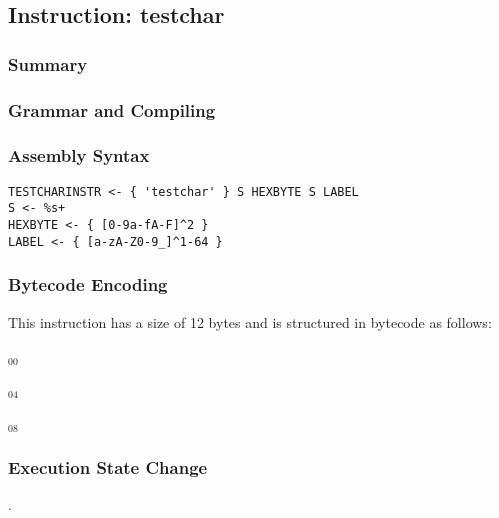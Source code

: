 \subsection{Instruction: testchar}

\subsubsection{Summary}


\subsubsection{Grammar and Compiling}


\subsubsection{Assembly Syntax}

\begin{myquote}
\begin{verbatim}
TESTCHARINSTR <- { 'testchar' } S HEXBYTE S LABEL
S <- %s+
HEXBYTE <- { [0-9a-fA-F]^2 }
LABEL <- { [a-zA-Z0-9_]^1-64 }
\end{verbatim}
\end{myquote}

\subsubsection{Bytecode Encoding}

This instruction has a size of 12 bytes and is structured in bytecode as follows:

$_{00}$\ 



$_{04}$\ 



$_{08}$\ 
\fbox{%
  \parbox{20pt}{%
00
  }%
}


\subsubsection{Execution State Change}

.


